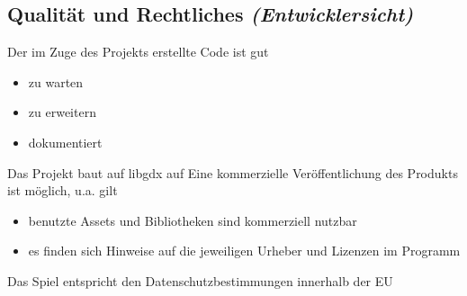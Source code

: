\subsection{Qualität und Rechtliches \textit{(Entwicklersicht)}}
\begin{requirements}
	 Der im Zuge des Projekts erstellte Code ist gut
		\begin{itemize}
			\item zu warten
			\item zu erweitern
			\item dokumentiert
		\end{itemize}
	 Das Projekt baut auf libgdx auf
	 Eine kommerzielle Veröffentlichung des Produkts ist möglich, u.a. gilt
		\begin{itemize}
			\item benutzte Assets und Bibliotheken sind kommerziell nutzbar
			\item es finden sich Hinweise auf die jeweiligen Urheber und Lizenzen im Programm
		\end{itemize}
	 Das Spiel entspricht den Datenschutzbestimmungen innerhalb der EU
\end{requirements}
